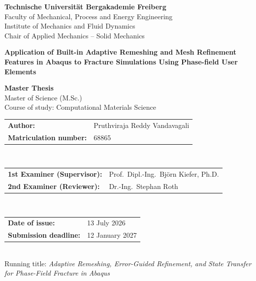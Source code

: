\documentclass[11pt,a4paper]{report}
\begin{document}
\begin{titlepage}
\centering
{\large\bfseries Technische Universit\"at Bergakademie Freiberg}\\[0.4em]
{\large Faculty of Mechanical, Process and Energy Engineering}\\[0.3em]
{\large Institute of Mechanics and Fluid Dynamics}\\[0.2em]
{\large Chair of Applied Mechanics -- Solid Mechanics}\\[2.5em]

{\LARGE\bfseries Application of Built-in Adaptive Remeshing and Mesh
Refinement Features in Abaqus to Fracture Simulations Using Phase-field
User Elements\par}
\vspace{1.5em}
{\large\bfseries Master Thesis}\\[0.4em]
{\large Master of Science (M.Sc.)}\\[0.3em]
{\large Course of study: Computational Materials Science}\\[2.2em]

\begin{tabular}{@{}ll@{}}
\textbf{Author:} & Pruthviraja Reddy Vandavagali \\
\textbf{Matriculation number:} & 68865 \\
\end{tabular}\\[1.8em]

\begin{tabular}{@{}p{}p{}@{}}
\textbf{1st Examiner (Supervisor):} &
Prof.\ Dipl.-Ing.\ Bj\"orn Kiefer, Ph.D. \\[0.8em]
\textbf{2nd Examiner (Reviewer):} &
Dr.-Ing.\ Stephan Roth \\
\end{tabular}\\[2.2em]

\begin{tabular}{@{}ll@{}}
\textbf{Date of issue:} & 13 July 2026 \\
\textbf{Submission deadline:} & 12 January 2027 \\
\end{tabular}\\[2.5em]

{\small Running title: \textit{Adaptive Remeshing, Error-Guided Refinement, and State Transfer for Phase-Field Fracture in Abaqus}}
\end{titlepage}
\end{document}
